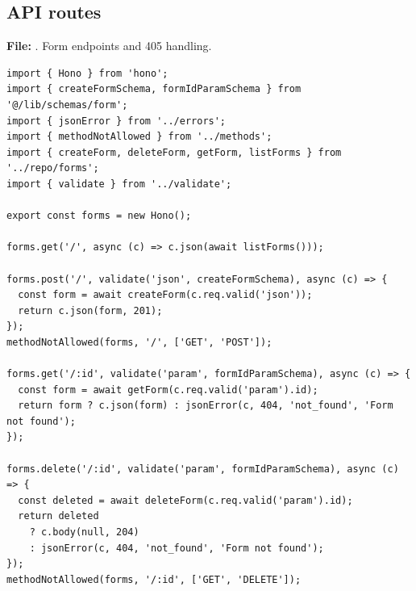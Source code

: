 \documentclass[11pt,a4paper]{article}
\begin{document}
\subsection{API routes}
\textbf{File:} . Form endpoints and 405 handling.\par
\begin{lstlisting}
import { Hono } from 'hono';
import { createFormSchema, formIdParamSchema } from '@/lib/schemas/form';
import { jsonError } from '../errors';
import { methodNotAllowed } from '../methods';
import { createForm, deleteForm, getForm, listForms } from '../repo/forms';
import { validate } from '../validate';

export const forms = new Hono();

forms.get('/', async (c) => c.json(await listForms()));

forms.post('/', validate('json', createFormSchema), async (c) => {
  const form = await createForm(c.req.valid('json'));
  return c.json(form, 201);
});
methodNotAllowed(forms, '/', ['GET', 'POST']);

forms.get('/:id', validate('param', formIdParamSchema), async (c) => {
  const form = await getForm(c.req.valid('param').id);
  return form ? c.json(form) : jsonError(c, 404, 'not_found', 'Form not found');
});

forms.delete('/:id', validate('param', formIdParamSchema), async (c) => {
  const deleted = await deleteForm(c.req.valid('param').id);
  return deleted
    ? c.body(null, 204)
    : jsonError(c, 404, 'not_found', 'Form not found');
});
methodNotAllowed(forms, '/:id', ['GET', 'DELETE']);
\end{lstlisting}
\end{document}
